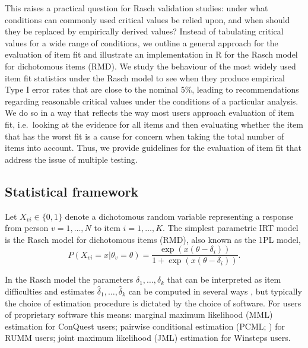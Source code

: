 \documentclass[11pt,a4paper]{article}
\begin{document}
This raises a practical question for Rasch validation studies: under what conditions can commonly used critical values be relied upon, and when should they be replaced by empirically derived values? Instead of tabulating critical values for a wide range of conditions, we outline a general approach for the evaluation of item fit and illustrate an implementation in R for the Rasch \citeyear{Rasch-1960} model for dichotomous items (RMD). We study the behaviour of the most widely used item fit statistics under the Rasch model to see when they produce empirical Type I error rates that are close to the nominal 5\%, leading to recommendations regarding reasonable critical values under the conditions of a particular analysis. We do so in a way that reflects the way most users approach evaluation of item fit, i.e.\ looking at the evidence for all items and then evaluating whether the item that has the worst fit is a cause for concern when taking the total number of items into account. Thus, we provide guidelines for the evaluation of item fit that address the issue of multiple testing.

\subsection{Statistical framework}

Let $X_{vi} \in \{0,1\}$ denote a dichotomous random variable representing a response from person $v = 1,\ldots, N$ to item $i = 1,\ldots,K$. The simplest parametric IRT model is the Rasch \citeyear{Rasch-1960} model for dichotomous items (RMD), also known as the 1PL model, 
\begin{equation}
\label{RMD}
P(X_{vi}=x|\theta_v=\theta)
=\frac{\exp(x(\theta-\delta_i))}{1 + \exp(x(\theta-\delta_i))}.
\end{equation}

In the Rasch model the parameters $\delta_1,\ldots,\delta_k$ that can be interpreted as item difficulties and estimates $\hat\delta_1,\ldots,\hat\delta_k$ can be computed in several ways \cite{Christensen-2013,Robitzsch-2021}, but typically the choice of estimation procedure is dictated by the choice of software. For users of proprietary software this means: marginal maximum likelihood (MML) estimation for ConQuest \cite{Adams-Wu-Cloney-et-al-2020} users; pairwise conditional estimation (PCML; ) for RUMM \cite{Andrich-Sheridan-Luo-et-al-2010} users; joint maximum likelihood (JML) estimation for Winsteps \cite{Linacre-2022} users. 
\end{document}
